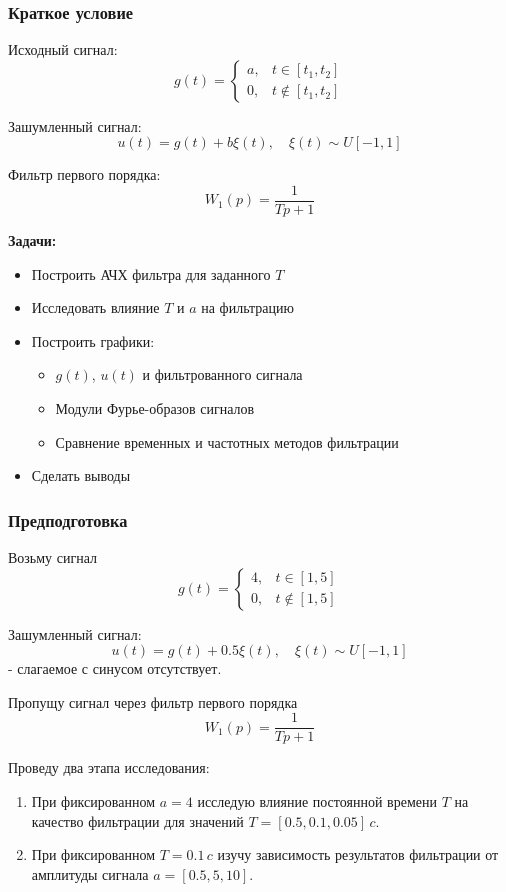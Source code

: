 \documentclass[a4paper,12pt]{article}
\begin{document}
	\subsubsection{Краткое условие}
	Исходный сигнал:
	\[ g(t) = 
	\begin{cases} 
		a, & t \in [t_1, t_2] \\
		0, & t \notin [t_1, t_2]
	\end{cases}
	\]
	
	Зашумленный сигнал:
	\[ u(t) = g(t) + b\xi(t), \quad \xi(t) \sim U[-1,1] \]
	
	Фильтр первого порядка:
	\[ W_1(p) = \frac{1}{Tp + 1} \]
	
	\textbf{Задачи:}
	\begin{itemize}
		\item Построить АЧХ фильтра для заданного $T$
		\item Исследовать влияние $T$ и $a$ на фильтрацию
		\item Построить графики:
		\begin{itemize}
			\item $g(t)$, $u(t)$ и фильтрованного сигнала
			\item Модули Фурье-образов сигналов
			\item Сравнение временных и частотных методов фильтрации
		\end{itemize}
		\item Сделать выводы
	\end{itemize}

	\subsubsection{Предподготовка}
	
	Возьму сигнал 
	\[ g(t) = 
	\begin{cases} 
		4, & t \in [1, 5] \\
		0, & t \notin [1, 5]
	\end{cases}
	\]
	
	Зашумленный сигнал:
	\[ u(t) = g(t) + 0.5\xi(t), \quad \xi(t) \sim U[-1,1] \] - слагаемое с синусом отсутствует.
	
	Пропущу сигнал через фильтр первого порядка
	\[ W_1(p) = \frac{1}{Tp + 1} \]
	
	
	Проведу два этапа исследования:
	
	\begin{enumerate}
		\item При фиксированном $a=4$ исследую влияние постоянной времени $T$ на качество фильтрации для значений $T = [0.5, 0.1, 0.05]\,c$.
		
		\item При фиксированном $T=0.1\,c$ изучу зависимость результатов фильтрации от амплитуды сигнала $a = [0.5, 5, 10]$.
	\end{enumerate}
	
\end{document}
